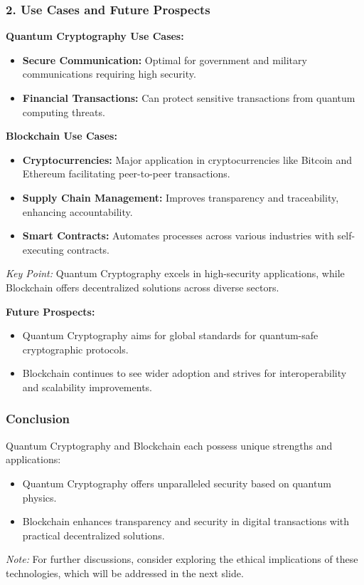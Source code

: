 \documentclass{beamer}
\begin{document}
\begin{frame}[fragile]
    \frametitle{2. Use Cases and Future Prospects}
    \textbf{Quantum Cryptography Use Cases:}
    \begin{itemize}
        \item \textbf{Secure Communication:} Optimal for government and military communications requiring high security.
        \item \textbf{Financial Transactions:} Can protect sensitive transactions from quantum computing threats.
    \end{itemize}

    \textbf{Blockchain Use Cases:}
    \begin{itemize}
        \item \textbf{Cryptocurrencies:} Major application in cryptocurrencies like Bitcoin and Ethereum facilitating peer-to-peer transactions.
        \item \textbf{Supply Chain Management:} Improves transparency and traceability, enhancing accountability.
        \item \textbf{Smart Contracts:} Automates processes across various industries with self-executing contracts.
    \end{itemize}

    \textit{Key Point:} Quantum Cryptography excels in high-security applications, while Blockchain offers decentralized solutions across diverse sectors.
    
    \vspace{1em} %

    \textbf{Future Prospects:}
    \begin{itemize}
        \item Quantum Cryptography aims for global standards for quantum-safe cryptographic protocols.
        \item Blockchain continues to see wider adoption and strives for interoperability and scalability improvements.
    \end{itemize}
\end{frame}

\begin{frame}[fragile]
    \frametitle{Conclusion}
    Quantum Cryptography and Blockchain each possess unique strengths and applications:
    \begin{itemize}
        \item Quantum Cryptography offers unparalleled security based on quantum physics.
        \item Blockchain enhances transparency and security in digital transactions with practical decentralized solutions.
    \end{itemize}

    \textit{Note:} For further discussions, consider exploring the ethical implications of these technologies, which will be addressed in the next slide.
\end{frame}
\end{document}
